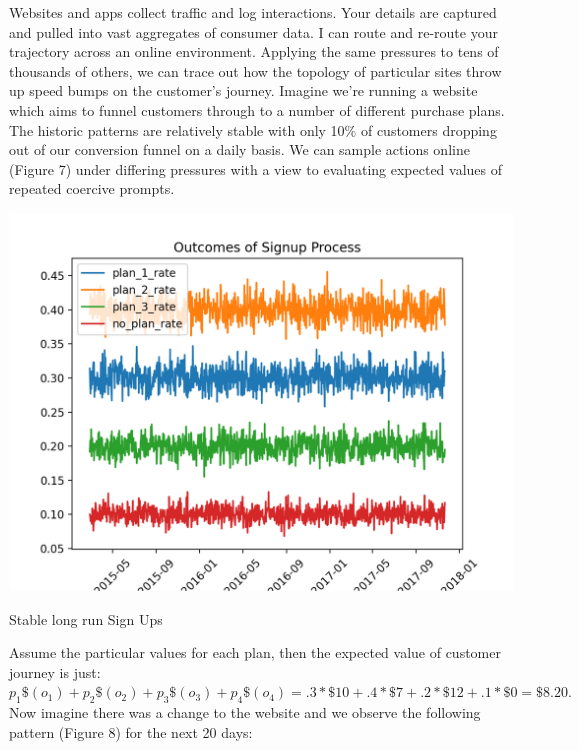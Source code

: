 \documentclass{tufte-handout}
\begin{document}
\noindent Websites and apps collect traffic and log interactions. Your details are captured and pulled into vast aggregates of consumer data. I can route and re-route your trajectory across an online environment. Applying the same pressures to tens of thousands of others, we can trace out how the topology of particular sites throw up speed bumps on the customer's journey. Imagine we're running a website which aims to funnel customers through to a number of different purchase plans. The historic patterns are relatively stable with only 10\% of customers dropping out of our conversion funnel on a daily basis. We can sample actions online (Figure 7) under differing pressures with a view to evaluating expected values of repeated coercive prompts.
\linebreak

\begin{marginfigure}
  \includegraphics[width=\linewidth]{../Expectation/Plots/outcomes_of_signup.png}
  \caption{Stable long run Sign Ups }
\end{marginfigure}

\noindent Assume the particular values for each plan, then the expected value of customer journey is just: $ p_{1}\$(o_{1}) + p_{2}\$(o_{2}) + p_{3}\$(o_{3}) + p_{4}\$(o_{4})  = .3*\$10 + .4*\$7  + .2*\$12 + .1*\$0 = \$8.20.$ Now imagine there was a change to the website and we observe the following pattern (Figure 8) for the next 20 days:
\linebreak
\end{document}
